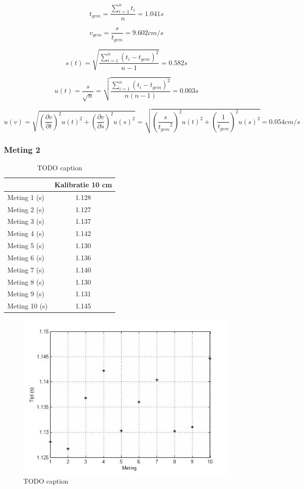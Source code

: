 \documentclass{report}
\begin{document}
$$ t_{gem}=\frac{\sum_{i=1}^{n}t_i}{n} = 1.041 s$$

$$ v_{gem} = \frac{s}{t_{gem}} = 9.602 cm/s$$

$$ s(t) = \sqrt{\frac{\sum_{i=1}^{n}( t_i-t_{gem})^2}{n-1}} = 0.582 s$$

$$ u(t) = \frac{s}{\sqrt{n}} = \sqrt{\frac{\sum_{i=1}^{n}( t_i-t_{gem})^2}{n(n-1)}} = 0.003 s$$ 

$$ u(v) = \sqrt{\left (\frac{\partial v }{\partial t }\right)^2 u(t)^2 + \left (\frac{\partial v }{\partial s }\right)^2 u(s)^2} = \sqrt{\left (\frac{s }{{t_{gem}}^2 }\right)^2 u(t)^2 + \left (\frac{1}{t_{gem} }\right)^2 u(s)^2} = 0.054 cm/s$$


\subsubsection*{Meting 2}
\begin{table}
\begin{center}
\begin{tabular}{| l| c|}
\hline
    & Kalibratie 10 cm \\
\hline
   Meting 1 (s) & 1.128\\
\hline
   Meting 2 (s) & 1.127\\
\hline
   Meting 3 (s) & 1.137\\
\hline
   Meting 4 (s) & 1.142\\
\hline
   Meting 5 (s) & 1.130 \\
\hline
   Meting 6 (s) & 1.136\\
\hline
   Meting 7 (s) & 1.140\\
\hline
   Meting 8 (s) & 1.130\\
\hline
   Meting 9 (s) & 1.131\\
\hline
   Meting 10 (s) & 1.145 \\
\hline
\end{tabular}
\caption{TODO caption}
\end{center}
\end{table}

\begin{figure}[H]
\begin{center}
\includegraphics[width=150mm] {grafiekmeetresultaten2.jpg}
\caption{TODO caption}
\end{center}
\end{figure}
\end{document}
